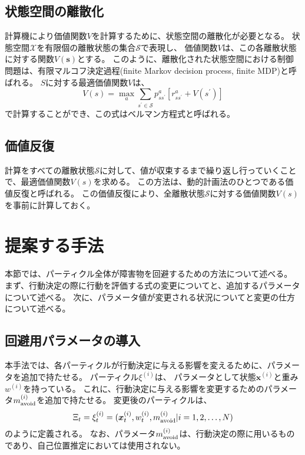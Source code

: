 \subsection{状態空間の離散化}
計算機により価値関数$V$を計算するために、状態空間の離散化が必要となる。
状態空間$\mathcal{X}$を有限個の離散状態の集合$\mathcal{S}$で表現し、
価値関数$V$は、この各離散状態に対する関数$V(\bm{s})$とする。
このように、離散化された状態空間における制御問題は、有限マルコフ決定過程(finite Markov decision process, finite MDP)と呼ばれる。
$S$に対する最適価値関数$V$は、
\begin{equation}
\label{bellman equation}
  V(s) = \max_{a} \sum_{s^{\prime} \in \mathcal{S}}
         p^{a}_{ss^{\prime}} \left[ r^{a}_{ss^{\prime}} + V(s^{\prime}) \right]
\end{equation}
で計算することができ、この式はベルマン方程式と呼ばれる。

\subsection{価値反復}
計算をすべての離散状態$\mathcal{S}$に対して、値が収束するまで繰り返し行っていくことで、最適価値関数$V(s)$を求める。
この方法は、動的計画法のひとつである価値反復と呼ばれる。
この価値反復により、全離散状態$\mathcal{S}$に対する価値関数$V(s)$を事前に計算しておく。


\section{提案する手法} \label{section:回避重み}
本節では、パーティクル全体が障害物を回避するための方法について述べる。
まず、行動決定の際に行動を評価する式の変更についてと、追加するパラメータについて述べる。
次に、パラメータ値が変更される状況についてと変更の仕方について述べる。

\subsection{回避用パラメータの導入}
本手法では、各パーティクルが行動決定に与える影響を変えるために、パラメータを追加で持たせる。
パーティクル$\xi^{(i)}$は、 パラメータとして状態$\bm{x}^{(i)}$と重み$w^{(i)}$を持っている。
これに、行動決定に与える影響を変更するためのパラメータ$m^{(i)}_{\rm avoid}$を追加で持たせる。
変更後のパーティクルは、
\begin{equation}
\label{particles}
  \Xi_{t} = {\xi^{(i)}_{t} =
  (\bm{x}^{(i)}_{t}, w^{(i)}_{t}, m^{(i)}_{\rm avoid} |i = 1,2,\dots,N) }
\end{equation}
のように定義される。
なお、パラメータ$m^{(i)}_{\rm avoid}$は、行動決定の際に用いるものであり、自己位置推定においては使用されない。

